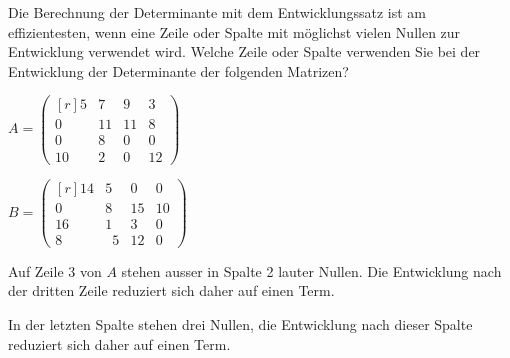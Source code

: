 Die Berechnung der Determinante mit dem Entwicklungssatz ist am effizientesten,
wenn eine Zeile oder Spalte mit möglichst vielen Nullen zur Entwicklung verwendet wird.
Welche Zeile oder Spalte verwenden Sie bei der Entwicklung der Determinante
der folgenden Matrizen?
\begin{teilaufgaben}
\item
\(\displaystyle
A
=
\begin{pmatrix*}[r]
    5 &   7 &   9 &   3 \\
    0 &  11 &  11 &   8 \\
    0 &   8 &   0 &   0 \\
   10 &   2 &   0 &  12
\end{pmatrix*}
\)
\item
\(\displaystyle
B
=
\begin{pmatrix*}[r]
   14 &            5 &   0 &   0 \\
    0 &            8 &  15 &  10 \\
   16 &            1 &   3 &   0 \\
    8 & \phantom{0}5 &  12 &   0
\end{pmatrix*}
\)
\end{teilaufgaben}

\begin{loesung}
\begin{teilaufgaben}
\item
Auf Zeile 3 von $A$ stehen ausser in Spalte 2 lauter Nullen.
Die Entwicklung nach der dritten Zeile reduziert sich daher auf einen Term.
\item
In der letzten Spalte stehen drei Nullen, die Entwicklung nach dieser
Spalte reduziert sich daher auf einen Term.
\qedhere
\end{teilaufgaben}
\end{loesung}
